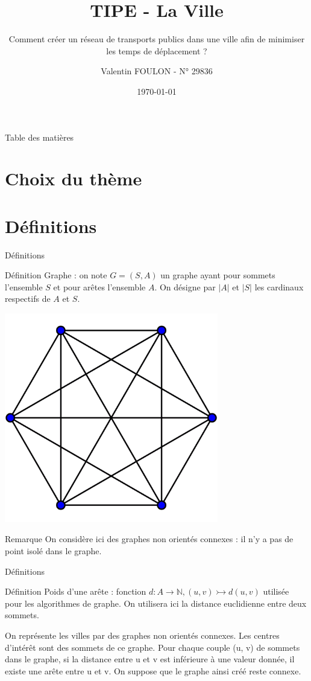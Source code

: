 \documentclass[aspectratio=43,11pt]{beamer}
\title{TIPE - La Ville}
\subtitle{Comment créer un réseau de transports publics dans une ville afin de minimiser les temps de déplacement ?}
\author{Valentin FOULON - N° 29836}
\date{\today}
\begin{document}
\begin{frame}
    \titlepage
\end{frame}
\begin{frame}{Table des matières}
    \tableofcontents
\end{frame}

\section{Choix du thème}

\section{Définitions}
\begin{frame}{Définitions}
    \begin{minipage}{0.7\textwidth}
    \begin{block}{Définition}
        Graphe : on note $G=(S, A)$ un graphe ayant pour sommets l'ensemble $S$ et pour arêtes l'ensemble $A$. On désigne par $|A|$ et $|S|$ les cardinaux respectifs de $A$ et $S$.
    \end{block}
    \end{minipage}
    \begin{minipage}{0.25\textwidth}
        \centering
    \includegraphics[width=0.7\textwidth]{graphe_complet}
    \end{minipage}
    \begin{exampleblock}{Remarque}
        On considère ici des graphes non orientés connexes : il n'y a pas de point isolé dans le graphe.
    \end{exampleblock}
\end{frame}
\begin{frame}{Définitions}
    \begin{block}{Définition}
        Poids d'une arête : fonction $d : A \rightarrow \mathbb{N}, (u, v) \rightarrowtail d(u, v)$ utilisée pour les algorithmes de graphe. On utilisera ici la distance euclidienne entre deux sommets.
    \end{block}
    On représente les villes par des graphes non orientés connexes. Les centres d'intérêt sont des sommets de ce graphe. Pour chaque couple (u, v) de sommets dans le graphe, si la distance entre u et v est inférieure à une valeur donnée, il existe une arête entre u et v. On suppose que le graphe ainsi créé reste connexe.
\end{frame}
\end{document}
